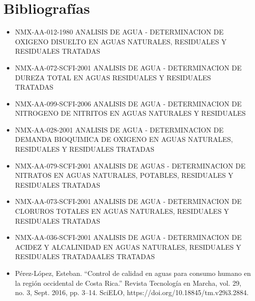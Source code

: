 \documentclass[a4paper,12pt]{article} %
\begin{document}
\section {Bibliografías}
\begin{itemize}
    \item {NMX-AA-012-1980 ANALISIS DE AGUA - DETERMINACION DE OXIGENO DISUELTO EN AGUAS NATURALES, RESIDUALES Y RESIDUALES TRATADAS}
    \item {NMX-AA-072-SCFI-2001 ANALISIS DE AGUA - DETERMINACION DE DUREZA TOTAL EN AGUAS RESIDUALES Y RESIDUALES TRATADAS}
    \item {NMX-AA-099-SCFI-2006 ANALISIS DE AGUA - DETERMINACION DE NITROGENO DE NITRITOS EN AGUAS NATURALES Y RESIDUALES}   \item{NMX-AA-028-2001 ANALISIS DE AGUA - DETERMINACION DE DEMANDA BIOQUIMICA DE OXIGENO EN AGUAS NATURALES, RESIDUALES Y RESIDUALES TRATADAS}
    \item{NMX-AA-079-SCFI-2001 ANALISIS DE AGUAS - DETERMINACION DE NITRATOS EN AGUAS NATURALES, POTABLES, RESIDUALES Y RESIDUALES TRATADAS}
    \item{NMX-AA-073-SCFI-2001 ANALISIS DE AGUA - DETERMINACION DE CLORUROS TOTALES EN AGUAS NATURALES, RESIDUALES Y RESIDUALES TRATADAS}
    \item{NMX-AA-036-SCFI-2001 ANALISIS DE AGUA - DETERMINACION DE ACIDEZ Y ALCALINIDAD EN AGUAS NATURALES, RESIDUALES Y RESIDUALES TRATADAALES TRATADAS}
    \item{Pérez-López, Esteban. “Control de calidad en aguas para consumo humano en la región occidental de Costa Rica.” Revista Tecnología en Marcha, vol. 29, no. 3, Sept. 2016, pp. 3–14. SciELO, https://doi.org/10.18845/tm.v29i3.2884.}
\end{itemize}



\printbibliography[
heading=bibintoc,
title={Bibliografías}
]
\end{document}

